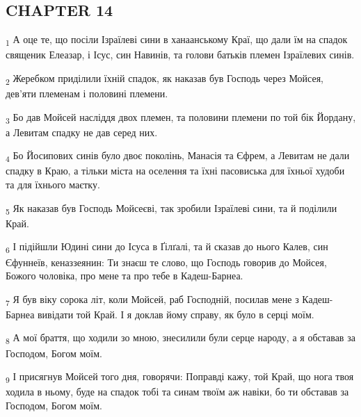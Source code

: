 \subsection{CHAPTER 14}
\begin{tcolorbox}
\textsubscript{1} А оце те, що посіли Ізраїлеві сини в ханаанському Краї, що дали їм на спадок священик Елеазар, і Ісус, син Навинів, та голови батьків племен Ізраїлевих синів.
\end{tcolorbox}
\begin{tcolorbox}
\textsubscript{2} Жеребком приділили їхній спадок, як наказав був Господь через Мойсея, дев'яти племенам і половині племени.
\end{tcolorbox}
\begin{tcolorbox}
\textsubscript{3} Бо дав Мойсей насліддя двох племен, та половини племени по той бік Йордану, а Левитам спадку не дав серед них.
\end{tcolorbox}
\begin{tcolorbox}
\textsubscript{4} Бо Йосипових синів було двоє поколінь, Манасія та Єфрем, а Левитам не дали спадку в Краю, а тільки міста на оселення та їхні пасовиська для їхньої худоби та для їхнього маєтку.
\end{tcolorbox}
\begin{tcolorbox}
\textsubscript{5} Як наказав був Господь Мойсеєві, так зробили Ізраїлеві сини, та й поділили Край.
\end{tcolorbox}
\begin{tcolorbox}
\textsubscript{6} І підійшли Юдині сини до Ісуса в Ґілґалі, та й сказав до нього Калев, син Єфуннеїв, кеназзеянин: Ти знаєш те слово, що Господь говорив до Мойсея, Божого чоловіка, про мене та про тебе в Кадеш-Барнеа.
\end{tcolorbox}
\begin{tcolorbox}
\textsubscript{7} Я був віку сорока літ, коли Мойсей, раб Господній, посилав мене з Кадеш-Барнеа вивідати той Край. І я доклав йому справу, як було в серці моїм.
\end{tcolorbox}
\begin{tcolorbox}
\textsubscript{8} А мої браття, що ходили зо мною, знесилили були серце народу, а я обставав за Господом, Богом моїм.
\end{tcolorbox}
\begin{tcolorbox}
\textsubscript{9} І присягнув Мойсей того дня, говорячи: Поправді кажу, той Край, що нога твоя ходила в ньому, буде на спадок тобі та синам твоїм аж навіки, бо ти обставав за Господом, Богом моїм.
\end{tcolorbox}
